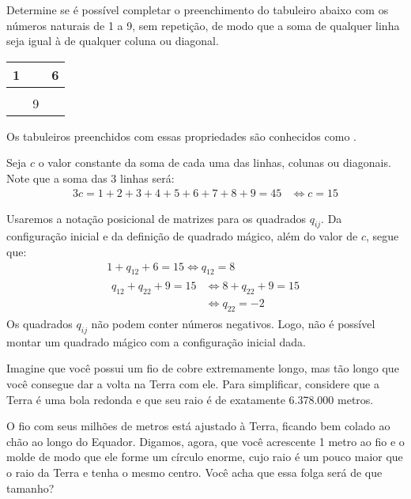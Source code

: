 \begin{example}
Determine se é possível completar o preenchimento do tabuleiro abaixo com os números naturais de 1 a 9, sem repetição, de modo que a soma de qualquer linha seja igual à de qualquer coluna ou diagonal.

\begin{center}
\begin{tabular}{|c|c|c|}
  \hline
  1 &   & 6 \\ \hline
    &   &   \\ \hline
    & 9 &   \\
  \hline
\end{tabular}
\end{center}
Os tabuleiros preenchidos com essas propriedades são conhecidos como .
\end{example}

\begin{solution}
Seja $c$ o valor constante da soma de cada uma das linhas, colunas ou diagonais. Note que a soma das 3 linhas será:
%
\begin{align*}
3c = 1+2+3+4+5+6+7+8+9=45 & \iff c =15
\end{align*}

Usaremos a notação posicional de matrizes para os quadrados $q_{ij}$. Da configuração inicial e da definição de quadrado mágico, além do valor de $c$, segue que:
%
\begin{gather*}
    1+q_{12}+6=15  \iff q_{12} = 8 \\
    \begin{aligned}
            q_{12} + q_{22} + 9= 15 & \iff 8+q_{22} + 9= 15\\
            & \iff q_{22} = -2
    \end{aligned}
\end{gather*}
%
\noindent Os quadrados $q_{ij}$ não podem conter números negativos. Logo, não é possível montar um quadrado mágico com a configuração inicial dada.
\end{solution}

\begin{example}
\label{ex:fio-terra}
Imagine que você possui um fio de cobre extremamente longo, mas tão longo que você consegue dar a volta na Terra com ele. Para simplificar, considere que a Terra é uma bola redonda e que seu raio é de exatamente 6.378.000 metros.

O fio com seus milhões de metros está ajustado à Terra, ficando bem colado ao chão ao longo do Equador. Digamos, agora, que você acrescente 1 metro ao fio e o molde de modo que ele forme um círculo enorme, cujo raio é um pouco maior que o raio da Terra e tenha o mesmo centro. Você acha que essa folga será de que tamanho?
\end{example}

